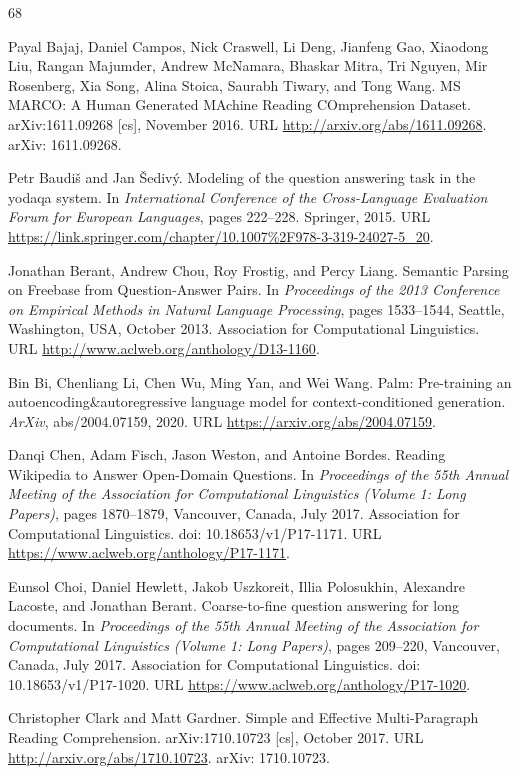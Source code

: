 \documentclass[10pt,letterpaper]{article}
\begin{document}
{\small
\begin{thebibliography}{68}
\setlength{\itemsep}{2pt}

 Payal Bajaj, Daniel Campos, Nick Craswell, Li Deng, Jianfeng Gao,
Xiaodong Liu, Rangan Majumder, Andrew McNamara, Bhaskar Mitra, Tri Nguyen, Mir
Rosenberg, Xia Song, Alina Stoica, Saurabh Tiwary, and Tong Wang. MS MARCO: A
Human Generated MAchine Reading COmprehension Dataset. arXiv:1611.09268 [cs],
November 2016. URL \url{http://arxiv.org/abs/1611.09268}. arXiv: 1611.09268.

 Petr Baudiš and Jan Šedivý. Modeling of the question answering
task in the yodaqa system. In \emph{International Conference of the
Cross-Language Evaluation Forum for European Languages}, pages 222--228.
Springer, 2015. URL
\url{https://link.springer.com/chapter/10.1007%2F978-3-319-24027-5_20}.

 Jonathan Berant, Andrew Chou, Roy Frostig, and Percy Liang.
Semantic Parsing on Freebase from Question-Answer Pairs. In \emph{Proceedings of
the 2013 Conference on Empirical Methods in Natural Language Processing}, pages
1533--1544, Seattle, Washington, USA, October 2013. Association for
Computational Linguistics. URL
\url{http://www.aclweb.org/anthology/D13-1160}.

 Bin Bi, Chenliang Li, Chen Wu, Ming Yan, and Wei Wang. Palm:
Pre-training an autoencoding\&autoregressive language model for
context-conditioned generation. \emph{ArXiv}, abs/2004.07159, 2020. URL
\url{https://arxiv.org/abs/2004.07159}.

 Danqi Chen, Adam Fisch, Jason Weston, and Antoine Bordes. Reading
Wikipedia to Answer Open-Domain Questions. In \emph{Proceedings of the 55th
Annual Meeting of the Association for Computational Linguistics (Volume 1: Long
Papers)}, pages 1870--1879, Vancouver, Canada, July 2017. Association for
Computational Linguistics. doi: 10.18653/v1/P17-1171. URL
\url{https://www.aclweb.org/anthology/P17-1171}.

 Eunsol Choi, Daniel Hewlett, Jakob Uszkoreit, Illia Polosukhin,
Alexandre Lacoste, and Jonathan Berant. Coarse-to-fine question answering for
long documents. In \emph{Proceedings of the 55th Annual Meeting of the
Association for Computational Linguistics (Volume 1: Long Papers)}, pages
209--220, Vancouver, Canada, July 2017. Association for Computational
Linguistics. doi: 10.18653/v1/P17-1020. URL
\url{https://www.aclweb.org/anthology/P17-1020}.

 Christopher Clark and Matt Gardner. Simple and Effective
Multi-Paragraph Reading Comprehension. arXiv:1710.10723 [cs], October 2017. URL
\url{http://arxiv.org/abs/1710.10723}. arXiv: 1710.10723.


\end{thebibliography}}
\end{document}
